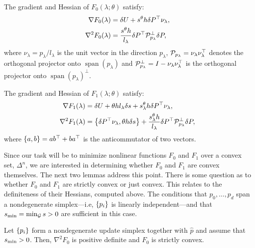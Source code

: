 \documentclass[sisc-eikonal.tex]{subfiles}
\begin{document}
\begin{proposition}\label{prop:F0-grad-and-Hess}
  The gradient and Hessian of $F_0(\lambda; \theta)$ satisfy:
  \begin{align}
    \nabla F_0(\lambda) &= \delta U + s^{\theta} h \delta P^\top \nu_\lambda,\label{eq:F0-grad} \\
    \nabla^2 F_0(\lambda) &= \frac{s^{\theta} h}{l_\lambda} \delta P^\top \calP^\perp_{p_\lambda} \delta P,
  \end{align}
  where $\nu_\lambda = p_\lambda/l_\lambda$ is the unit vector in the
  direction $p_\lambda$,
  $\mathcal{P}_{p_\lambda} = \nu_\lambda \nu_\lambda^\top$ denotes the
  orthogonal projector onto $\operatorname{span}(p_\lambda)$ and
  $\mathcal{P}_{p_\lambda}^\perp = I - \nu_\lambda \nu_\lambda^\top$ is the
  orthogonal projector onto $\operatorname{span}(p_\lambda)^\perp$.
\end{proposition}

\begin{proposition}\label{prop:F1-grad-and-Hess}
  The gradient and Hessian of $F_1(\lambda; \theta)$ satisfy:
  \begin{align}
    \nabla F_1(\lambda) &= \delta U + \theta h l_\lambda \delta s + s^{\theta}_\lambda h \delta P^\top \nu_\lambda, \\
    \nabla^2 F_1(\lambda) &= \set{\delta P^\top \nu_\lambda, \theta h \delta s} + \frac{s^\theta_\lambda h}{l_\lambda} \delta P^\top \calP^\perp_{p_\lambda} \delta P, \label{eq:hess-F1}
  \end{align}
  where $\left\{a, b\right\} = ab^\top + ba^\top$ is the anticommutator of two
  vectors.
\end{proposition}

Since our task will be to minimize nonlinear functions $F_0$ and $F_1$
over a convex set, $\Delta^n$, we are interested in determining
whether $F_0$ and $F_1$ are convex themselves. The next two lemmas
address this point. There is some question as to whether $F_0$ and
$F_1$ are strictly convex or just convex. This relates to the
definiteness of their Hessians, computed above. The conditions that
$p_0, \hdots, p_d$ span a nondegenerate simplex---i.e, $\left\{p_i\right\}$ is
linearly independent---and that $s_{\operatorname{min}} = \min_{\mathcal{G}} s > 0$ are
sufficient in this case.

\begin{lemma}\label{lemma:dPt-cprojp-dP-pd}
  Let $\left\{p_i\right\}$ form a nondegenerate update simplex together with
  $\hat{p}$ and assume that $s_{\operatorname{min}} > 0$. Then, $\nabla^2 F_0$ is
  positive definite and $F_0$ is strictly convex.
\end{lemma}
\end{document}
